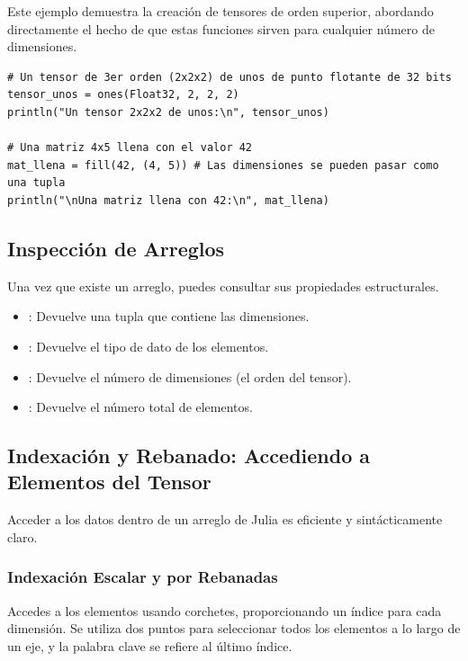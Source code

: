 \begin{example}
Este ejemplo demuestra la creación de tensores de orden superior, abordando directamente el hecho de que estas funciones sirven para cualquier número de dimensiones.
\begin{verbatim}
# Un tensor de 3er orden (2x2x2) de unos de punto flotante de 32 bits
tensor_unos = ones(Float32, 2, 2, 2)
println("Un tensor 2x2x2 de unos:\n", tensor_unos)

# Una matriz 4x5 llena con el valor 42
mat_llena = fill(42, (4, 5)) # Las dimensiones se pueden pasar como una tupla
println("\nUna matriz llena con 42:\n", mat_llena)
\end{verbatim}
\end{example}

\subsection*{Inspección de Arreglos}
Una vez que existe un arreglo, puedes consultar sus propiedades estructurales.
\begin{itemize}
    \item \textbf{}: Devuelve una tupla que contiene las dimensiones.
    \item \textbf{}: Devuelve el tipo de dato de los elementos.
    \item \textbf{}: Devuelve el número de dimensiones (el orden del tensor).
    \item \textbf{}: Devuelve el número total de elementos.
\end{itemize}

\subsection*{Indexación y Rebanado: Accediendo a Elementos del Tensor}
Acceder a los datos dentro de un arreglo de Julia es eficiente y sintácticamente claro.

\subsubsection*{Indexación Escalar y por Rebanadas}
Accedes a los elementos usando corchetes, proporcionando un índice para cada dimensión. Se utiliza dos puntos \jcode{:} para seleccionar todos los elementos a lo largo de un eje, y la palabra clave  se refiere al último índice.

